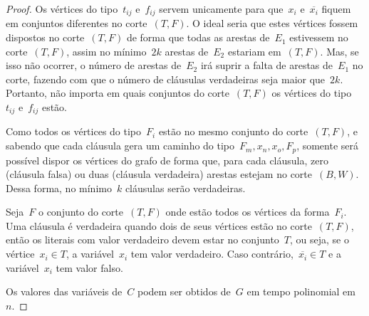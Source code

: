 \begin{proof}
		Os vértices do tipo~$t_{ij}$ e~$f_{ij}$ servem unicamente
		para que~$x_i$ e~$\overline{x_i}$ fiquem em conjuntos
		diferentes no corte~$(T,F)$.
		O ideal seria que estes vértices fossem dispostos no 
		corte~$(T,F)$ de forma que todas as arestas de~$E_1$ 
		estivessem no corte~$(T,F)$, assim no mínimo~$2k$ arestas 
		de~$E_2$ estariam em~$(T,F)$.
		Mas, se isso não ocorrer,
		o número de arestas de~$E_2$ irá suprir a falta de arestas
		de~$E_1$ no corte,
		fazendo com que o número de cláusulas verdadeiras seja maior
		que~$2k$.
		Portanto, não importa em quais conjuntos do corte~$(T,F)$ os 
		vértices do tipo~$t_{ij}$ e~$f_{ij}$ estão.

		Como todos os vértices do tipo~$F_i$ estão no mesmo conjunto
		do corte~$(T,F)$, e sabendo que cada cláusula gera um 
		caminho do tipo~$F_m,x_n,x_o,F_p$, somente será possível
		dispor os vértices do grafo de forma que, para cada cláusula,
		zero (cláusula falsa) ou duas (cláusula verdadeira) arestas 
		estejam no corte~$(B,W)$.
		Dessa forma, no mínimo~$k$ cláusulas serão verdadeiras. 

		Seja~$F$ o conjunto do corte~$(T,F)$ onde estão todos os vértices
		da forma~$F_i$.
		Uma cláusula é verdadeira quando dois de seus vértices
		estão no corte~$(T,F)$, então os literais com valor verdadeiro
		devem estar no conjunto~$T$,
		ou seja, 
		se o vértice~$x_i\in T$, a variável~$x_i$ tem valor verdadeiro.
		Caso contrário,~$\overline{x_i}\in T$ e a variável~$x_i$ tem valor falso.
		
		Os valores das variáveis de~$C$ podem ser obtidos de~$G$ em
		tempo polinomial em~$n$.
	\end{proof}








